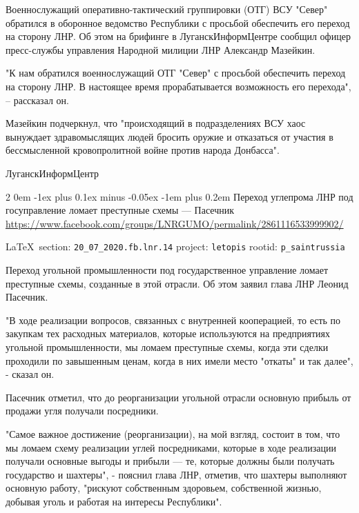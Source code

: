 \documentclass[a4paper,11pt]{extreport}
\makeatletter
\renewcommand\subsection{%
  \clearpage
    \@startsection{subsection}%
    {2}%
    {0em}%
    {-1ex plus 0.1ex minus -0.05ex}%
    {-1em plus 0.2em}%
    {\scshape\bfseries\Large}%
}
\makeatother
\begin{document}
Военнослужащий оперативно-тактический группировки (ОТГ) ВСУ "Север" обратился в
оборонное ведомство Республики с просьбой обеспечить его переход на сторону
ЛНР. Об этом на брифинге в ЛуганскИнформЦентре сообщил офицер пресс-службы
управления Народной милиции ЛНР Александр Мазейкин.

"К нам обратился военнослужащий ОТГ "Север" с просьбой обеспечить переход на
сторону ЛНР. В настоящее время прорабатывается возможность его перехода", –
рассказал он.

Мазейкин подчеркнул, что "происходящий в подразделениях ВСУ хаос вынуждает
здравомыслящих людей бросить оружие и отказаться от участия в бессмысленной
кровопролитной войне против народа Донбасса".

ЛуганскИнформЦентр
  
 
 
  
  
\subsection{Переход углепрома ЛНР под госуправление ломает преступные схемы --- Пасечник}
\label{sec:20_07_2020.fb.lnr.14}
\url{https://www.facebook.com/groups/LNRGUMO/permalink/2861116533999902/}

\vspace{0.5cm}
{\small\LaTeX~section: \verb|20_07_2020.fb.lnr.14| project: \verb|letopis| rootid: \verb|p_saintrussia|}
\vspace{0.5cm}

Переход угольной промышленности под государственное управление ломает
преступные схемы, созданные в этой отрасли. Об этом заявил глава ЛНР Леонид
Пасечник.

"В ходе реализации вопросов, связанных с внутренней кооперацией, то есть по
закупкам тех расходных материалов, которые используются на предприятиях
угольной промышленности, мы ломаем преступные схемы, когда эти сделки проходили
по завышенным ценам, когда в них имели место "откаты" и так далее", - сказал
он.

Пасечник отметил, что до реорганизации угольной отрасли основную прибыль от
продажи угля получали посредники.

"Самое важное достижение (реорганизации), на мой взгляд, состоит в том, что мы
ломаем схему реализации углей посредниками, которые в ходе реализации получали
основные выгоды и прибыли --- те, которые должны были получать государство и
шахтеры", - пояснил глава ЛНР, отметив, что шахтеры выполняют основную работу,
"рискуют собственным здоровьем, собственной жизнью, добывая уголь и работая на
интересы Республики".
\end{document}
